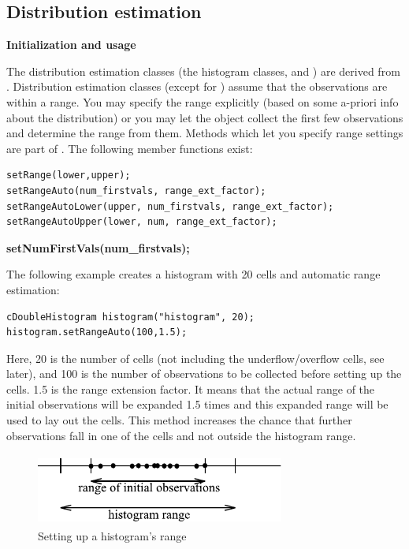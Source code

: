 \subsection{Distribution estimation}

\textbf{Initialization and usage}


The distribution estimation classes (the histogram classes,
 and ) are derived from
. Distribution estimation classes (except for
) assume that the observations are within a range.
You may specify the range explicitly (based on some a-priori info
about the distribution) or you may let the object collect the first
few observations and determine the range from them. Methods which let
you specify range settings are part of . The
following member functions exist:

\begin{verbatim}
setRange(lower,upper);
setRangeAuto(num_firstvals, range_ext_factor);
setRangeAutoLower(upper, num_firstvals, range_ext_factor);
setRangeAutoUpper(lower, num, range_ext_factor);
\end{verbatim}

\textbf{setNumFirstVals(num\_firstvals);}


The following example creates a histogram with 20 cells and automatic
range estimation:

\begin{verbatim}
cDoubleHistogram histogram("histogram", 20);
histogram.setRangeAuto(100,1.5);
\end{verbatim}


Here, 20 is the number of cells (not including the underflow/overflow
cells, see later), and 100 is the number of observations to be
collected before setting up the cells. 1.5 is the range extension
factor. It means that the actual range of the initial observations
will be expanded 1.5 times and this expanded range will be used to lay
out the cells. This method increases the chance that further
observations fall in one of the cells and not outside the histogram
range.

\begin{figure}[htbp]
  \begin{center}
    \includegraphics[width=3.215in, height=0.930in]{figures/usmanFig12}
    \caption{Setting up a histogram's range}
  \end{center}
\end{figure}

